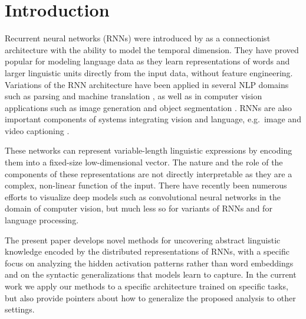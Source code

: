 
\section{Introduction}
\label{sec:intro}
Recurrent neural networks (RNNs) were introduced by
\cite{elman1990finding}
as a connectionist architecture with the
ability to model the temporal dimension. They have proved popular for
modeling language data as they learn representations of words and
larger linguistic units directly from the input data, without feature
engineering. Variations of the RNN architecture have been applied in
several NLP domains such as parsing \citep{vinyals2015grammar} and
machine translation \citep{bahdanau2014neural}, as well as in computer
vision applications such as image generation \citep{gregor2015draw} and
object segmentation \citep{visin2015reseg}. RNNs are also important
components of systems integrating vision and language, e.g.\ image
\citep{karpathy2015deep} and video captioning \citep{yu2015video}.

These networks can represent variable-length linguistic expressions by
encoding them into a fixed-size low-dimensional vector. The nature and
the role of the components of these representations are not directly
interpretable as they are a complex, non-linear function of the
input. There have recently been numerous efforts to visualize deep
models such as convolutional neural networks in the domain of computer
vision, but much less so for variants of RNNs and for language
processing.

The present paper develops novel methods for uncovering abstract
linguistic knowledge encoded by the distributed representations of RNNs,
with a specific focus on analyzing the hidden activation patterns rather
than word embeddings and on the syntactic generalizations
that models learn to capture. In the current work we apply our methods
to a specific architecture trained on specific tasks, but also provide
pointers about how to generalize the proposed analysis to other settings.

